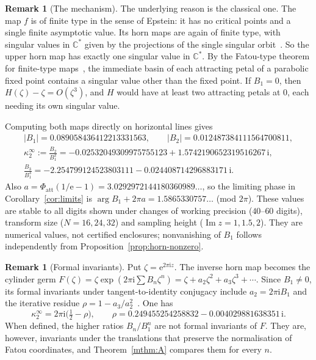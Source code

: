 \documentclass[11pt]{amsart}
\theoremstyle{definition}
\newtheorem{remark}[theorem]{Remark}
\newcommand{\eee}{\mathrm{e}}
\newcommand{\ii}{\mathrm{i}}
\begin{document}
\begin{remark}[The mechanism]\label{rem:horn-mechanism}
The underlying reason is the classical one.  The map $f$ is of finite type
in the sense of Epstein: it has no critical points and a single finite
asymptotic value.  Its horn maps are again of finite type, with singular
values in $\mathbb C^*$ given by the projections of the single singular
orbit~\cite{Epstein1993}.  So the upper horn map has exactly one singular
value in $\mathbb C^*$.  By the Fatou-type theorem for finite-type
maps~\cite{Epstein1993}, the immediate basin of each attracting petal of a
parabolic fixed point contains a singular value other than the fixed point.
If $B_1=0$, then $H(\zeta)-\zeta=O(\zeta^3)$, and $H$ would have at least two
attracting petals at $0$, each needing its own singular value.
\end{remark}
Computing both maps directly on horizontal lines gives
\begin{equation}\label{eq:B12}
\begin{gathered}
 |B_1|=0.089058436412213331563,\qquad |B_2|=0.012487384111564700811,\\
 \kappa_2^\infty:=\frac{B_2}{B_1^2}=-0.02532049309975755123+1.5742190652319516267\,\ii,\\
 \frac{B_3}{B_1^3}=-2.254799124523803111-0.024408714296883171\,\ii .
\end{gathered}
\end{equation}
Also $a=\Phi_{\mathrm{att}}(1/\eee-1)=3.0292972144180360989\ldots$, so the limiting
phase in Corollary~\ref{cor:limits} is $\arg B_1+2\pi a=1.5865330757\ldots$
(mod $2\pi$).  These values are stable to all digits shown under changes of working
precision ($40$--$60$ digits), transform size ($N=16,24,32$) and sampling
height ($\operatorname{Im}z=1,1.5,2$).  They are numerical values, not
certified enclosures; nonvanishing of $B_1$ follows independently from
Proposition~\ref{prop:horn-nonzero}.

\begin{remark}[Formal invariants]\label{rem:formal}
Put $\zeta=\eee^{2\pi\ii z}$.  The inverse horn map becomes the cylinder germ
$F(\zeta)=\zeta\exp(2\pi\ii\sum B_n\zeta^n)=\zeta+a_2\zeta^2+a_3\zeta^3+\cdots$.
Since $B_1\ne0$, its formal invariants under tangent-to-identity conjugacy
include $a_2=2\pi\ii B_1$ and the iterative residue
$\rho=1-a_3/a_2^2$~\cite{BuffEpstein2002}.  One has
\begin{equation}\label{eq:kapparho}
 \kappa_2^\infty=2\pi\ii\bigl(\tfrac12-\rho\bigr),\qquad
 \rho=0.249455254258832-0.004029881638351\,\ii .
\end{equation}
When defined, the higher ratios $B_n/B_1^n$ are not formal invariants of $F$.  They are,
however, invariants under the translations that preserve the normalisation of
Fatou coordinates, and Theorem~\ref{mthm:A} compares them for every $n$.
\end{remark}
\end{document}
